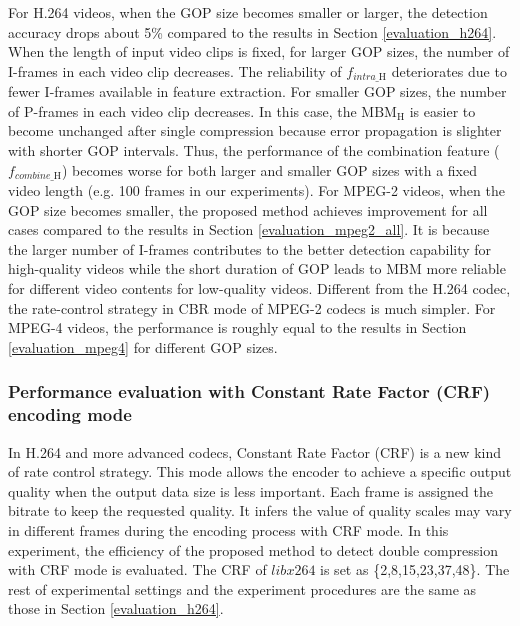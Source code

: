 \documentclass[journal,sort]{IEEEtran}
\begin{document}
For H.264 videos, when the GOP size becomes smaller or larger, the detection accuracy drops about 5\% compared to the results in Section \ref{evaluation_h264}. When the length of input video clips is fixed, for larger GOP sizes, the number of I-frames in each video clip decreases. The reliability of $f_{intra\_\text{H}}$ deteriorates due to fewer I-frames available in feature extraction. For smaller GOP sizes, the number of P-frames in each video clip decreases. In this case, the $\text{MBM}_\text{H}$ is easier to become unchanged after single compression because error propagation is slighter with shorter GOP intervals. Thus, the performance of the combination feature ($f_{combine\_\text{H}}$) becomes worse for both larger and smaller GOP sizes with a fixed video length (e.g. 100 frames in our experiments). For MPEG-2 videos, when the GOP size becomes smaller, the proposed method achieves improvement for all cases compared to the results in Section \ref{evaluation_mpeg2_all}. It is because the larger number of I-frames contributes to the better detection capability for high-quality videos while the short duration of GOP leads to MBM more reliable for different video contents for low-quality videos. Different from the H.264 codec, the rate-control strategy in CBR mode of MPEG-2 codecs is much simpler. For MPEG-4 videos, the performance is roughly equal to the results in Section \ref{evaluation_mpeg4} for different GOP sizes.

\subsubsection{Performance evaluation with Constant Rate Factor (CRF) encoding mode}
In H.264 and more advanced codecs, Constant Rate Factor (CRF) is a new kind of rate control strategy. This mode allows the encoder to achieve a specific output quality when the output data size is less important. Each frame is assigned the bitrate to keep the requested quality. It infers the value of quality scales may vary in different frames during the encoding process with CRF mode. In this experiment, the efficiency of the proposed method to detect double compression with CRF mode is evaluated. The CRF of $libx264$ is set as \{2,8,15,23,37,48\}. The rest of experimental settings and the experiment procedures are the same as those in Section \ref{evaluation_h264}. 
\end{document}
